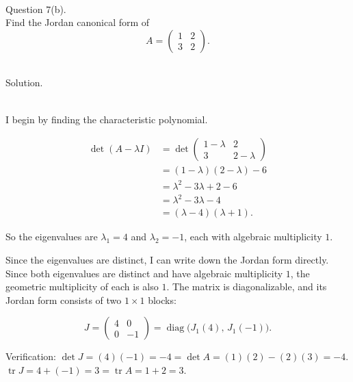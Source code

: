 \documentclass{article}
\begin{document}
\bigskip


\newpage

\hfill \break  $~\!\!$ \dotfill \medskip \\
\textnormal{Question 7(b).}\\
Find the Jordan canonical form of
\[
A = \begin{pmatrix} 1 & 2 \\ 3 & 2 \end{pmatrix}.
\]

\noindent\\
\textnormal{Solution.}\\
\quad\\
\begin{mdframed}[linewidth=1pt]
\textnormal{I begin by finding the characteristic polynomial.}

\begin{align*}
\det(A - \lambda I) &= \det\begin{pmatrix} 1-\lambda & 2 \\ 3 & 2-\lambda \end{pmatrix} \\
&= (1-\lambda)(2-\lambda) - 6 \\
&= \lambda^2 - 3\lambda + 2 - 6 \\
&= \lambda^2 - 3\lambda - 4 \\
&= (\lambda - 4)(\lambda + 1).
\end{align*}

So the eigenvalues are $\lambda_1 = 4$ and $\lambda_2 = -1$, each with algebraic multiplicity $1$.

\medskip
\textnormal{Since the eigenvalues are distinct, I can write down the Jordan form directly.} Since both eigenvalues are distinct and have algebraic multiplicity $1$, the geometric multiplicity of each is also $1$. The matrix is diagonalizable, and its Jordan form consists of two $1 \times 1$ blocks:

\[
\boxed{J = \begin{pmatrix} 4 & 0 \\ 0 & -1 \end{pmatrix} = \operatorname{diag}\bigl(J_1(4),\, J_1(-1)\bigr).}
\]

\medskip
\textnormal{Verification:} $\det J = (4)(-1) = -4 = \det A = (1)(2) - (2)(3) = -4$. $\operatorname{tr} J = 4 + (-1) = 3 = \operatorname{tr} A = 1 + 2 = 3$.\end{mdframed}
\end{document}
